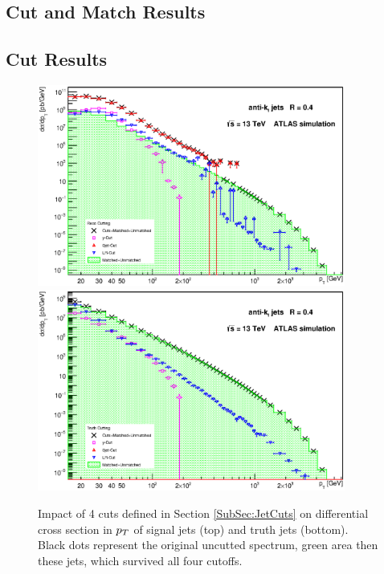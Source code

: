 \begin{appendices}

\chapter{Cut and Match Results}
\label{App:CutAndMatchingResults}

\newpage 

\section{Cut Results}
\begin{figure}[H]
  \centering
  \includegraphics[width=0.9\textwidth]{Chapter3/SignalCutting.eps}
  \includegraphics[width=0.9\textwidth]{Chapter3/TruthCutting.eps}
  \caption{Impact of 4 cuts defined in Section \ref{SubSec:JetCuts} on
  differential cross section in $p_{T}$ of signal jets (top) and truth jets
  (bottom). Black dots represent the original uncutted spectrum, green area then
  these jets, which survived all four cutoffs.}
  \label{fig:Cutting}
\end{figure}


\end{appendices}
